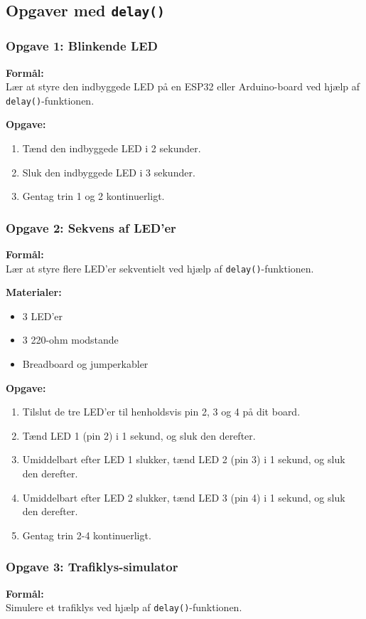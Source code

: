 \subsection*{Opgaver med \texttt{delay()}}

\subsubsection*{Opgave 1: Blinkende LED}
\textbf{Formål:}\\
Lær at styre den indbyggede LED på en ESP32 eller Arduino-board ved hjælp af \texttt{delay()}-funktionen.

\textbf{Opgave:}
\begin{enumerate}
	\item Tænd den indbyggede LED i 2 sekunder.
	\item Sluk den indbyggede LED i 3 sekunder.
	\item Gentag trin 1 og 2 kontinuerligt.
\end{enumerate}

\subsubsection*{Opgave 2: Sekvens af LED'er}
\textbf{Formål:}\\
Lær at styre flere LED'er sekventielt ved hjælp af \texttt{delay()}-funktionen.

\textbf{Materialer:}
\begin{itemize}
	\item 3 LED'er
	\item 3 220-ohm modstande
	\item Breadboard og jumperkabler
\end{itemize}

\textbf{Opgave:}
\begin{enumerate}
	\item Tilslut de tre LED'er til henholdsvis pin 2, 3 og 4 på dit board.
	\item Tænd LED 1 (pin 2) i 1 sekund, og sluk den derefter.
	\item Umiddelbart efter LED 1 slukker, tænd LED 2 (pin 3) i 1 sekund, og sluk den derefter.
	\item Umiddelbart efter LED 2 slukker, tænd LED 3 (pin 4) i 1 sekund, og sluk den derefter.
	\item Gentag trin 2-4 kontinuerligt.
\end{enumerate}

\subsubsection*{Opgave 3: Trafiklys-simulator}
\textbf{Formål:}\\
Simulere et trafiklys ved hjælp af \texttt{delay()}-funktionen.

